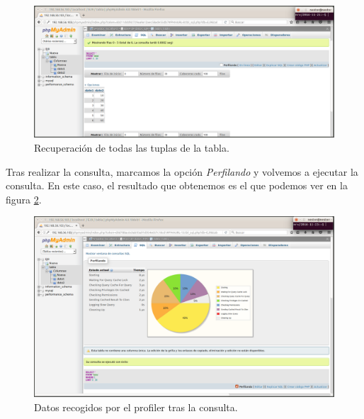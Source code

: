 \documentclass[a4paper,titlepage,12pt]{scrartcl}	%
\numberwithin{figure}{section} %
\numberwithin{table}{section} %
\begin{document}
	\begin{figure}[H]
		\includegraphics[width=\linewidth]{./Imagenes/9-5.png}
		\vspace{-0.5cm}
		\caption[Recuperación de todas las tuplas de la tabla.]{Recuperación de todas las tuplas de la tabla.}
		\label{9-5}
	\end{figure}
	
	Tras realizar la consulta, marcamos la opción \textit{Perfilando} y volvemos a ejecutar la consulta. En este caso, el resultado que obtenemos es el que podemos ver en la figura \ref{9-6}.
	
	\begin{figure}[H]
		\includegraphics[width=\linewidth]{./Imagenes/9-6.png}
		\vspace{-0.5cm}
		\caption[Datos recogidos por el profiler tras la consulta.]{Datos recogidos por el profiler tras la consulta.}
		\label{9-6}
	\end{figure}
	
\end{document}
